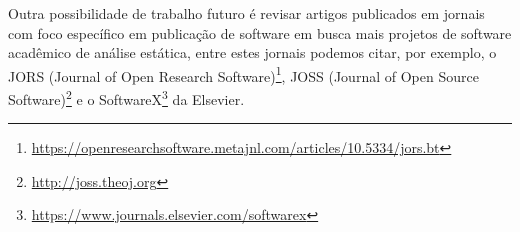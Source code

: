

Outra possibilidade de trabalho futuro é revisar artigos publicados em jornais
com foco específico em publicação de software em busca mais projetos de
software acadêmico de análise estática, entre estes jornais podemos citar, por
exemplo, o JORS (Journal of Open Research
Software)\footnote{\url{https://openresearchsoftware.metajnl.com/articles/10.5334/jors.bt}},
JOSS (Journal of Open Source Software)\footnote{\url{http://joss.theoj.org}} e
o SoftwareX\footnote{\url{https://www.journals.elsevier.com/softwarex}} da
Elsevier. 

%
%
